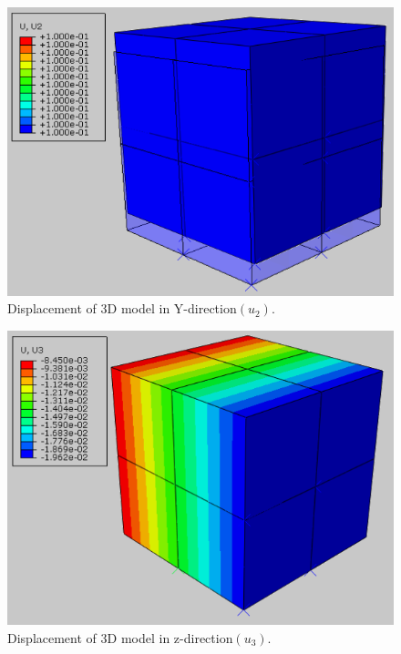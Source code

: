 \documentclass[12pt]{article}
\begin{document}
\begin{figure}[H]
	\begin{center}
		\includegraphics[scale=1.1]{3d_model_U2_crop.png}  
	\end{center}  
	\caption{Displacement of 3D model in Y-direction$(u_2)$.}
\end{figure}
\begin{figure}[H]
	\begin{center}
		\includegraphics[scale=1.1]{3d_model_U3_crop.png}  
	\end{center}  
	\caption{Displacement of 3D model in z-direction$(u_3)$.}
\end{figure}
\end{document}
